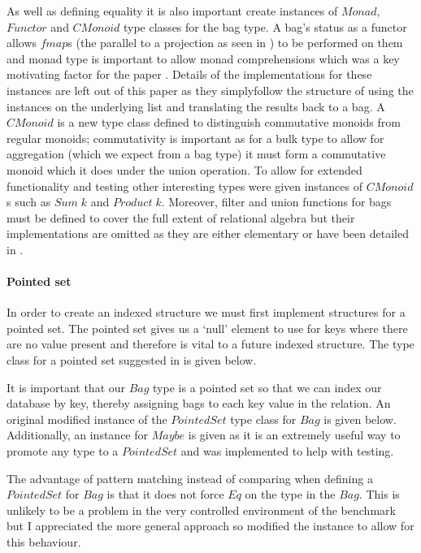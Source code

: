 As well as defining equality it is also important create instances of $Monad$,
$Functor$ and $CMonoid$ type classes for the bag type. A bag's status as a functor allows $fmap$s
(the parallel to a projection as seen in ) to be performed on
them and monad type is important to allow monad comprehensions which was a key
motivating factor for the paper \relalg{}. Details of the implementations for these instances are
left out of this paper as they simplyfollow the structure of using the instances on
the underlying list and translating the results back to a bag. A $CMonoid$ is a new type class
defined to distinguish commutative monoids from regular monoids; commutativity
is important as for a bulk type to allow for aggregation (which we expect from a
bag type) it must form a commutative monoid which it does under the union
operation. To allow for extended functionality and testing other interesting
types were given instances of $CMonoid$s such as $Sum\;k$ and $Product\;k$. Moreover, filter
and union functions for bags must be defined to cover the full extent of
relational algebra but their implementations are omitted as they are either
elementary or have been detailed in \relalg{}.

\paragraph{Pointed set} In order to create an indexed structure we must first
implement structures for a pointed set. The pointed set gives us a `null'
element to use for keys where there are no value present and therefore is vital
to a future indexed structure. The type class for a pointed set suggested in
\relalg{} is given below.



\noindent
It is important that our $Bag$ type is a pointed set so that we can index our
database by key, thereby assigning bags to each key value in the relation. An
original modified instance of the $PointedSet$ type class for $Bag$ is given
below. Additionally, an instance for $Maybe$ is given as it is an extremely
useful way to promote any type to a $PointedSet$ and was implemented to help
with testing.



\noindent
The advantage of pattern matching instead of comparing when defining a
$PointedSet$ for $Bag$ is that it does not force $Eq$ on the type in the $Bag$.
This is unlikely to be a problem in the very controlled environment of the
benchmark but I appreciated the more general approach so modified the instance
to allow for this behaviour.
